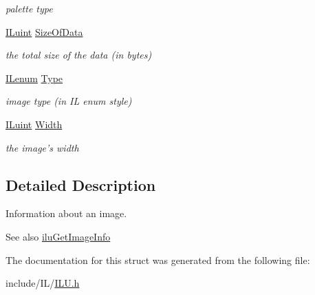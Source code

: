 \begin{DoxyCompactItemize}
\begin{DoxyCompactList}\small\item\em palette type \end{DoxyCompactList}\item 
\hypertarget{struct_i_l_uinfo_ad3bfe4c8a6696b42835730f7b70327b7}{\hyperlink{group__il__types_gaff8e86a1072c8d7cfe387fb87c6ed8e1}{I\+Luint} \hyperlink{struct_i_l_uinfo_ad3bfe4c8a6696b42835730f7b70327b7}{Size\+Of\+Data}}\label{struct_i_l_uinfo_ad3bfe4c8a6696b42835730f7b70327b7}

\begin{DoxyCompactList}\small\item\em the total size of the data (in bytes) \end{DoxyCompactList}\item 
\hypertarget{struct_i_l_uinfo_a437e4fc3b579e2e7879dedd0fd2ac587}{\hyperlink{group__il__types_ga62ca73445716183ef42b1f3906a45ed0}{I\+Lenum} \hyperlink{struct_i_l_uinfo_a437e4fc3b579e2e7879dedd0fd2ac587}{Type}}\label{struct_i_l_uinfo_a437e4fc3b579e2e7879dedd0fd2ac587}

\begin{DoxyCompactList}\small\item\em image type (in I\+L enum style) \end{DoxyCompactList}\item 
\hypertarget{struct_i_l_uinfo_a4146e7b2b0b4097e0e335f9b348392bf}{\hyperlink{group__il__types_gaff8e86a1072c8d7cfe387fb87c6ed8e1}{I\+Luint} \hyperlink{struct_i_l_uinfo_a4146e7b2b0b4097e0e335f9b348392bf}{Width}}\label{struct_i_l_uinfo_a4146e7b2b0b4097e0e335f9b348392bf}

\begin{DoxyCompactList}\small\item\em the image's width \end{DoxyCompactList}\end{DoxyCompactItemize}


\subsection{Detailed Description}
Information about an image. 

\begin{DoxySeeAlso}{See also}
\hyperlink{group__ilu__util_ga2dba9fc87a5d05e1401cd5fa08cd5728}{ilu\+Get\+Image\+Info} 
\end{DoxySeeAlso}


The documentation for this struct was generated from the following file\+:\begin{DoxyCompactItemize}
\item 
include/\+I\+L/\hyperlink{_i_l_u_8h}{I\+L\+U.\+h}\end{DoxyCompactItemize}
